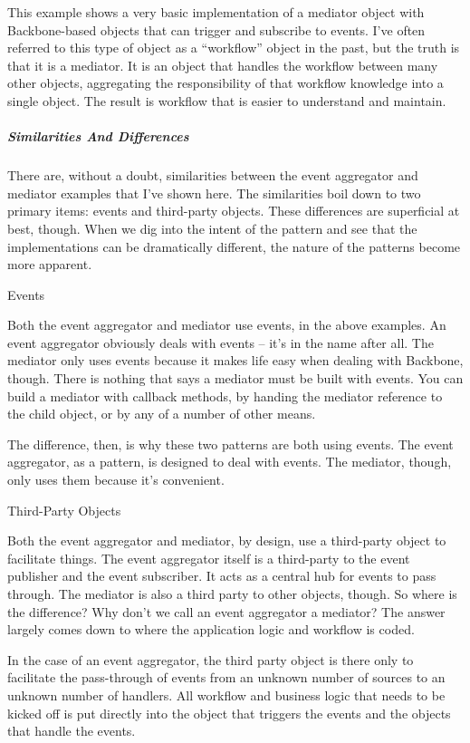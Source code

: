 \documentclass[9pt]{book}
\begin{document}
This example shows a very basic implementation of a mediator object with
Backbone-based objects that can trigger and subscribe to events. I've
often referred to this type of object as a ``workflow'' object in the
past, but the truth is that it is a mediator. It is an object that
handles the workflow between many other objects, aggregating the
responsibility of that workflow knowledge into a single object. The
result is workflow that is easier to understand and maintain.

\subparagraph{Similarities And
Differences}\label{similarities-and-differences}

There are, without a doubt, similarities between the event aggregator
and mediator examples that I've shown here. The similarities boil down
to two primary items: events and third-party objects. These differences
are superficial at best, though. When we dig into the intent of the
pattern and see that the implementations can be dramatically different,
the nature of the patterns become more apparent.

Events

Both the event aggregator and mediator use events, in the above
examples. An event aggregator obviously deals with events -- it's in the
name after all. The mediator only uses events because it makes life easy
when dealing with Backbone, though. There is nothing that says a
mediator must be built with events. You can build a mediator with
callback methods, by handing the mediator reference to the child object,
or by any of a number of other means.

The difference, then, is why these two patterns are both using events.
The event aggregator, as a pattern, is designed to deal with events. The
mediator, though, only uses them because it's convenient.

Third-Party Objects

Both the event aggregator and mediator, by design, use a third-party
object to facilitate things. The event aggregator itself is a
third-party to the event publisher and the event subscriber. It acts as
a central hub for events to pass through. The mediator is also a third
party to other objects, though. So where is the difference? Why don't we
call an event aggregator a mediator? The answer largely comes down to
where the application logic and workflow is coded.

In the case of an event aggregator, the third party object is there only
to facilitate the pass-through of events from an unknown number of
sources to an unknown number of handlers. All workflow and business
logic that needs to be kicked off is put directly into the object that
triggers the events and the objects that handle the events.
\end{document}
